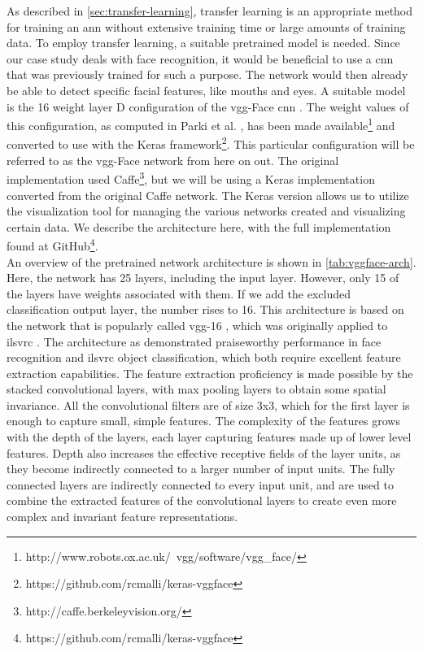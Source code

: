 As described in \autoref{sec:transfer-learning}, transfer learning is an appropriate method for training an \acrshort{ann} without extensive training time or large amounts of training data. To employ transfer learning, a suitable pretrained model is needed. Since our case study deals with face recognition, it would be beneficial to use a \acrshort{cnn} that was previously trained for such a purpose. The network would then already be able to detect specific facial features, like mouths and eyes. A suitable model is the 16 weight layer D configuration of the \acrshort{vgg}-Face \acrshort{cnn} \cite{deep-face-rec}. The weight values of this configuration, as computed in Parki et al. \cite{deep-face-rec}, has been made available\footnote{http://www.robots.ox.ac.uk/~vgg/software/vgg\_face/} and converted to use with the Keras framework\footnote{https://github.com/rcmalli/keras-vggface}. This particular configuration will be referred to as the \acrshort{vgg}-Face network from here on out. The original implementation used Caffe\footnote{http://caffe.berkeleyvision.org/}, but we will be using a Keras implementation converted from the original Caffe network. The Keras version allows us to utilize the visualization tool for managing the various networks created and visualizing certain data. We describe the architecture here, with the full implementation found at GitHub\footnote{https://github.com/rcmalli/keras-vggface}. \\

\noindent An overview of the pretrained network architecture is shown in \autoref{tab:vggface-arch}. Here, the network has 25 layers, including the input layer. However, only 15 of the layers have weights associated with them. If we add the excluded classification output layer, the number rises to 16. This architecture is based on the network that is popularly called \acrshort{vgg}-16 \cite{vgg}, which was originally applied to \acrshort{ilsvrc} \cite{imagenet}. The architecture as demonstrated praiseworthy performance in face recognition and \acrshort{ilsvrc} object classification, which both require excellent feature extraction capabilities. The feature extraction proficiency is made possible by the stacked convolutional layers, with max pooling layers to obtain some spatial invariance. All the convolutional filters are of size 3x3, which for the first layer is enough to capture small, simple features. The complexity of the features grows with the depth of the layers, each layer capturing features made up of lower level features. Depth also increases the effective receptive fields of the layer units, as they become indirectly connected to a larger number of input units. The fully connected layers are indirectly connected to every input unit, and are used to combine the extracted features of the convolutional layers to create even more complex and invariant feature representations. \\


